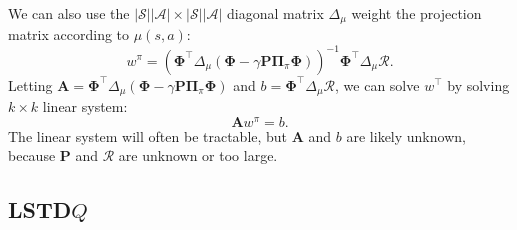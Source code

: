 \documentclass{article}
\newcommand{\parens}[1]{\left(#1\right)}
\newcommand{\abs}[1]{\left|#1\right|}
\begin{document}
We can also use the $\abs{\mathcal{S}}\abs{\mathcal{A}}\times \abs{\mathcal{S}}\abs{\mathcal{A}}$ diagonal matrix $\Delta_{\mu}$ weight the projection matrix according to  $\mu(s,a)$:
\[
	w^{\pi}=\parens{\mathbf{\Phi}^\intercal\Delta_{\mu}\parens{\mathbf{\Phi}-\gamma \mathbf{P}\mathbf{\Pi}_{\pi}\mathbf{\Phi}}}^{-1}\mathbf{\Phi}^\intercal\Delta_{\mu}\mathcal{R}.
\]
Letting $\mathbf{A}=\mathbf{\Phi}^\intercal\Delta_{\mu}\parens{\mathbf{\Phi}-\gamma \mathbf{P}\mathbf{\Pi}_{\pi}\mathbf{\Phi}}$ and $b=\mathbf{\Phi}^\intercal\Delta_{\mu}\mathcal{R}$, we can solve $w^\intercal$ by solving $k\times k$ linear system:
\[
	\mathbf{A}w^{\pi}=b.
\]
The linear system will often be tractable, but $\mathbf{A}$ and $b$ are likely unknown, because $\mathbf{P}$ and $\mathcal{R}$ are unknown or too large.

\subsection*{LSTD$Q$} %
\label{sub:lstd_q_}

\end{document}
